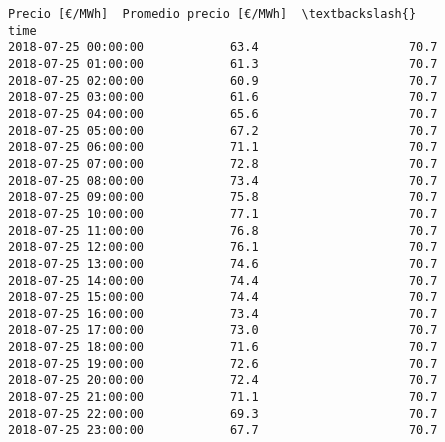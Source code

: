 \documentclass[11pt]{article}
\makeatletter
\newcommand{\boxspacing}{\kern\kvtcb@left@rule\kern\kvtcb@boxsep}
\newcommand{\prompt}[4]{
        {\ttfamily\llap{{\color{#2}[#3]:\hspace{3pt}#4}}\vspace{-\baselineskip}}
    }
\makeatother
\begin{document}
            \begin{tcolorbox}[breakable, size=fbox, boxrule=.5pt, pad at break*=1mm, opacityfill=0]
\prompt{Out}{outcolor}{97}{\boxspacing}
\begin{Verbatim}[commandchars=\\\{\}]
                     Precio [€/MWh]  Promedio precio [€/MWh]  \textbackslash{}
time
2018-07-25 00:00:00            63.4                     70.7
2018-07-25 01:00:00            61.3                     70.7
2018-07-25 02:00:00            60.9                     70.7
2018-07-25 03:00:00            61.6                     70.7
2018-07-25 04:00:00            65.6                     70.7
2018-07-25 05:00:00            67.2                     70.7
2018-07-25 06:00:00            71.1                     70.7
2018-07-25 07:00:00            72.8                     70.7
2018-07-25 08:00:00            73.4                     70.7
2018-07-25 09:00:00            75.8                     70.7
2018-07-25 10:00:00            77.1                     70.7
2018-07-25 11:00:00            76.8                     70.7
2018-07-25 12:00:00            76.1                     70.7
2018-07-25 13:00:00            74.6                     70.7
2018-07-25 14:00:00            74.4                     70.7
2018-07-25 15:00:00            74.4                     70.7
2018-07-25 16:00:00            73.4                     70.7
2018-07-25 17:00:00            73.0                     70.7
2018-07-25 18:00:00            71.6                     70.7
2018-07-25 19:00:00            72.6                     70.7
2018-07-25 20:00:00            72.4                     70.7
2018-07-25 21:00:00            71.1                     70.7
2018-07-25 22:00:00            69.3                     70.7
2018-07-25 23:00:00            67.7                     70.7


\end{Verbatim}
\end{tcolorbox}
\end{document}
